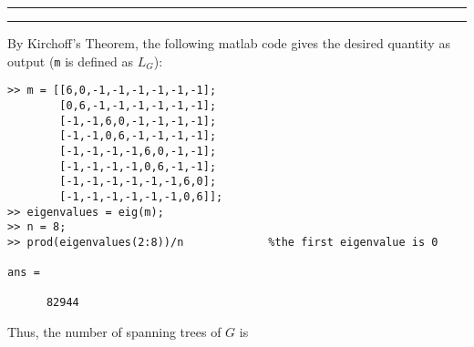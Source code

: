 \documentclass[11pt]{article}
\newcounter{questionCounter}
\newcounter{partCounter}[questionCounter]
\newenvironment{question}[2][\arabic{questionCounter}]{%
    \setcounter{partCounter}{0}%
    \vspace{.25in} \hrule \vspace{0.5em}%
        \noindent{\bf #2}%
    \vspace{0.8em} \hrule \vspace{.10in}%
    \addtocounter{questionCounter}{1}%
}{}
\begin{document}
\begin{question}{Problem 8}
By Kirchoff's Theorem, the following matlab code gives the desired quantity as
output (\texttt{m} is defined as $L_G$):

\begin{verbatim}
>> m = [[6,0,-1,-1,-1,-1,-1,-1];
        [0,6,-1,-1,-1,-1,-1,-1];
        [-1,-1,6,0,-1,-1,-1,-1];
        [-1,-1,0,6,-1,-1,-1,-1];
        [-1,-1,-1,-1,6,0,-1,-1];
        [-1,-1,-1,-1,0,6,-1,-1];
        [-1,-1,-1,-1,-1,-1,6,0];
        [-1,-1,-1,-1,-1,-1,0,6]];
>> eigenvalues = eig(m);
>> n = 8;
>> prod(eigenvalues(2:8))/n             %the first eigenvalue is 0

ans =

      82944
\end{verbatim}
Thus, the number of spanning trees of $G$ is 
\end{question}
\end{document}
